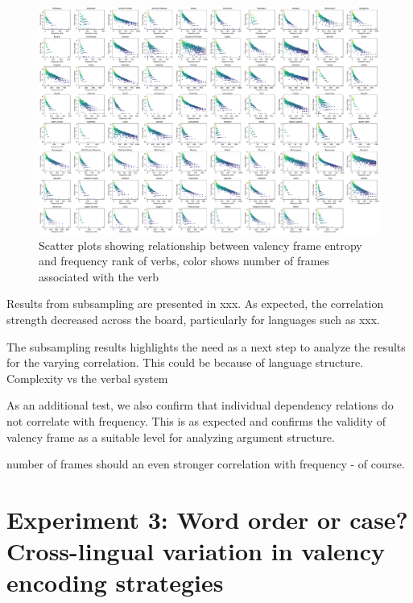 \begin{figure}
  \centering
  \includegraphics[width=\textwidth]{figures/joint_entropy_freq.pdf}
  \caption{Scatter plots showing relationship between valency frame entropy and frequency rank of verbs, color shows number of frames associated with the verb}
  \label{fig:joint_entropy_freq}
\end{figure}



Results from subsampling are presented in xxx. As expected, the correlation strength decreased across the board, particularly for languages such as xxx. 


The subsampling results highlights the need as a next step to analyze the results for the varying correlation. This could be because of language structure. Complexity vs the verbal system 


As an additional test, we also confirm that individual dependency relations do not correlate with frequency. This is as expected and confirms the validity of valency frame as a suitable level for analyzing argument structure.

number of frames should an even stronger correlation with frequency - of course. 


\section{Experiment 3: Word order or case? Cross-lingual variation in valency encoding strategies}\label{sec:exp3-ablation}
